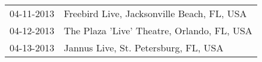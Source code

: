 \begin{supertabular}{ll}
 04-11-2013 &  Freebird Live, Jacksonville Beach, FL, USA \\
 04-12-2013 &  The Plaza 'Live' Theatre, Orlando, FL, USA \\
 04-13-2013 &        Jannus Live, St. Petersburg, FL, USA \\
\end{supertabular}
